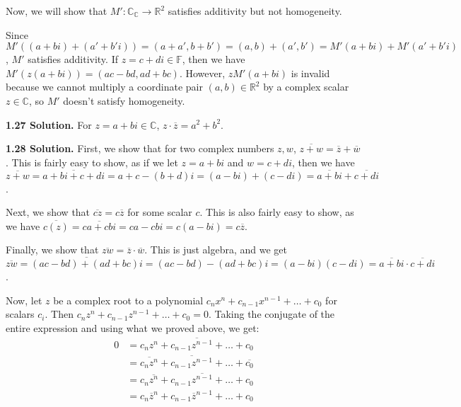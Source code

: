 Now, we will show that $M':\mathbb{C}_\mathbb{C}\to\mathbb{R}^2$ satisfies additivity but not homogeneity.

Since $M'((a+bi)+(a'+b'i))=(a+a',b+b')=(a,b)+(a',b')=M'(a+bi)+M'(a'+b'i)$, $M'$ satisfies additivity. If $z=c+di\in\mathbb{F}$, then we have $M'(z(a+bi))=(ac-bd, ad+bc)$. However, $zM'(a+bi)$ is invalid because we cannot multiply a coordinate pair $(a,b)\in\mathbb{R}^2$ by a complex scalar $z\in\mathbb{C}$, so $M'$ doesn't satisfy homogeneity.

\textbf{1.27 Solution.} %
For $z=a+bi\in\mathbb{C}$, $z\cdot\overline{z}=a^2+b^2$.

\textbf{1.28 Solution.} First, we show that for two complex numbers $z,w$,  $\overline{z+w}=\overline{z}+\overline{w}$. This is fairly easy to show, as if we let $z=a+bi$ and $w=c+di$, then we have $\overline{z+w}=\overline{a+bi+c+di}= a+c-(b+d)i= (a-bi)+(c-di)=\overline{a+bi}+\overline{c+di}$.

Next, we show that $\overline{cz}=c\overline{z}$ for some scalar $c$. This is also fairly easy to show, as we have $\overline{c(z)}=\overline{ca+cbi}=ca-cbi=c(a-bi)=c\overline{z}$.

Finally, we show that $\overline{zw}=\overline{z}\cdot\overline{w}$. This is just algebra, and we get $\overline{zw}=\overline{(ac-bd)+(ad+bc)i}=(ac-bd)-(ad+bc)i=(a-bi)(c-di)=\overline{a+bi}\cdot\overline{c+di}$.

Now, let $z$ be a complex root to a polynomial $c_nx^n+c_{n-1}x^{n-1}+\ldots+c_0$ for scalars $c_i$. Then $c_nz^n+c_{n-1}z^{n-1}+\ldots+c_0=0$. Taking the conjugate of the entire expression and using what we proved above, we get:
\begin{align*}
0 &= \overline{c_nz^n+c_{n-1}z^{n-1}+\ldots+c_0} \\ &= \overline{c_nz^n}+\overline{c_{n-1}z^{n-1}}+\ldots+\overline{c_0} \\ &= c_n\overline{z^n}+c_{n-1}\overline{z^{n-1}}+\ldots+c_0 \\ &= c_n\overline{z}^n+c_{n-1}\overline{z}^{n-1}+\ldots+c_0
\end{align*}

